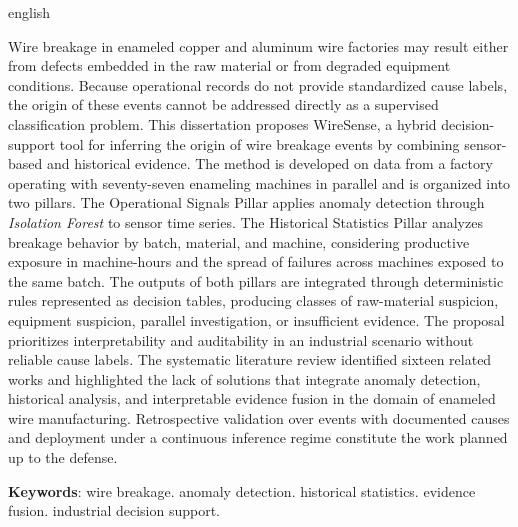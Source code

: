 
\begin{resumo}[Abstract]
 \begin{otherlanguage*}{english}

Wire breakage in enameled copper and aluminum wire factories may result either from defects embedded in the raw material or from degraded equipment conditions. Because operational records do not provide standardized cause labels, the origin of these events cannot be addressed directly as a supervised classification problem. This dissertation proposes WireSense, a hybrid decision-support tool for inferring the origin of wire breakage events by combining sensor-based and historical evidence. The method is developed on data from a factory operating with seventy-seven enameling machines in parallel and is organized into two pillars. The Operational Signals Pillar applies anomaly detection through \emph{Isolation Forest} to sensor time series. The Historical Statistics Pillar analyzes breakage behavior by batch, material, and machine, considering productive exposure in machine-hours and the spread of failures across machines exposed to the same batch. The outputs of both pillars are integrated through deterministic rules represented as decision tables, producing classes of raw-material suspicion, equipment suspicion, parallel investigation, or insufficient evidence. The proposal prioritizes interpretability and auditability in an industrial scenario without reliable cause labels. The systematic literature review identified sixteen related works and highlighted the lack of solutions that integrate anomaly detection, historical analysis, and interpretable evidence fusion in the domain of enameled wire manufacturing. Retrospective validation over events with documented causes and deployment under a continuous inference regime constitute the work planned up to the defense.

   \textbf{Keywords}: wire breakage. anomaly detection. historical statistics. evidence fusion. industrial decision support.
 \end{otherlanguage*}
\end{resumo}
